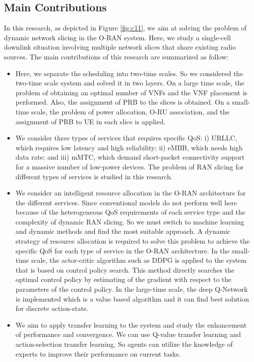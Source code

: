 \documentclass{article}
\begin{document}
\subsection{Main Contributions}
In this research, as depicted in Figure \ref{fig:c11}, we aim at solving the problem of dynamic network slicing in the O-RAN system. 
Here, we study a single-cell downlink situation involving multiple network slices that share existing radio sources.
The main contributions of
this research are summarized as follow:
\begin{itemize}
\item 
Here, we separate the scheduling into two-time scales. So we considered the two-time scale system and solved it in two layers. On a large time scale, the problem of obtaining an optimal number of VNFs and the VNF placement is performed. Also, the assignment of PRB to the slices is obtained. On a small-time scale, the problem of power allocation, O-RU association, and the assignment of PRB to UE in each slice is applied.
\item 
We consider three types of services that requires specific QoS: i) URLLC, which requires low latency and high reliability; ii) eMBB, which needs high data rate; and iii) mMTC, which demand short-packet connectivity support for a massive number of low-power devices.
The problem of RAN slicing for different types of services is studied in this research.

\item 
We consider an intelligent resource allocation in the O-RAN architecture for the different services. Since conventional models do not perform well here because of the heterogeneous QoS requirements of each service type and the complexity of dynamic RAN slicing. So we must switch to machine learning and dynamic methods and find the most suitable approach.  
A dynamic strategy of resource allocation is required to solve this problem to achieve the specific QoS for each type of service in the O-RAN architecture.
 In the small-time scale, the actor-critic algorithm such as DDPG is applied to the system that is based on control policy search. This method directly searches the optimal control policy
by estimating of the gradient with respect to the parameters
of the control policy. In the large-time scale, the deep Q-Network is implemented which is a value based algorithm and it can find best solution for discrete action-state.
\item 
We aim to apply transfer learning to the system and study the enhancement of performance and convergence. We can use Q-value transfer learning and action-selection transfer learning, So agents can utilize the knowledge of experts to improve their performance on current tasks\cite{zhou2021learning}. 
\end{itemize}
\end{document}
